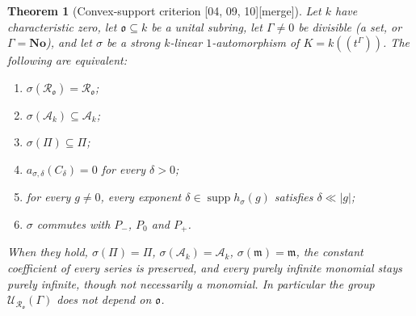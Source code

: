 \documentclass[11pt,oneside]{article}
\numberwithin{equation}{section}
\newtheorem{theorem}{Theorem}[section]
\theoremstyle{definition}
\theoremstyle{remark}
\newcommand{\No}{\mathbf{No}}
\newcommand{\oo}{\mathfrak o}
\newcommand{\Ak}{\mathcal A_k}
\newcommand{\Ro}{\mathcal R_{\oo}}
\newcommand{\mm}{\mathfrak m}
\newcommand{\UU}{\mathcal U}
\newcommand{\supp}{\operatorname{supp}}
\newcommand{\bb}{\mathbin{\ll}}
\newcommand{\Hahn}[2]{#1((t^{#2}))}
\newcommand{\src}[1]{\textup{\textsf{\small[#1]}}}
\newcommand{\mergetag}{\textup{\textsf{\small[merge]}}}
\begin{document}
\begin{theorem}[Convex-support criterion \src{04, 09, 10}\mergetag]\label{opa:thm:criterion}
Let $k$ have characteristic zero, let $\oo\subseteq k$ be a unital subring,
let $\Gamma\ne0$ be divisible (a set, or $\Gamma=\No$), and let $\sigma$ be a
strong $k$-linear $1$-automorphism of $K=\Hahn k\Gamma$. The following are
equivalent:
\begin{enumerate}[label=\textup{(\roman*)},itemsep=1pt]
\item $\sigma(\Ro)=\Ro$;
\item $\sigma(\Ak)\subseteq\Ak$;
\item $\sigma(\Pi)\subseteq\Pi$;
\item $a_{\sigma,\delta}(C_\delta)=0$ for every $\delta>0$;
\item for every $g\ne0$, every exponent $\delta\in\supp h_\sigma(g)$ satisfies
$\delta\bb|g|$;
\item $\sigma$ commutes with $P_-$, $P_0$ and $P_+$.
\end{enumerate}
When they hold, $\sigma(\Pi)=\Pi$, $\sigma(\Ak)=\Ak$, $\sigma(\mm)=\mm$,
the constant coefficient of every series is preserved, and every purely
infinite monomial stays purely infinite, though not necessarily a monomial.
In particular the group $\UU_{\Ro}(\Gamma)$ does not depend on $\oo$.
\end{theorem}
\end{document}
